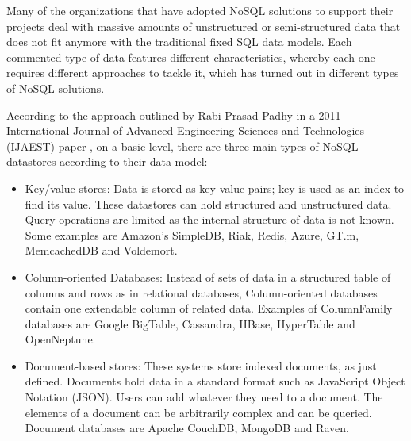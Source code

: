 Many of the organizations that have adopted NoSQL solutions to support their projects deal with massive amounts of unstructured or semi-structured data that does not fit anymore with the traditional fixed SQL data models. Each commented type of data features different characteristics, whereby each one requires different approaches to tackle it, which has turned out in different types of NoSQL solutions.
\par
According to the approach outlined by Rabi Prasad Padhy in a 2011 International Journal of Advanced Engineering Sciences and Technologies (IJAEST) paper \cite{padhy2011rdbms}, on a basic level, there are three main types of NoSQL datastores according to their data model:
\begin{itemize}
\item Key/value stores: Data is stored as key-value pairs; key is used as an index to find its value. These datastores can hold structured and unstructured data. Query operations are limited as the internal structure of data is not known. Some examples are Amazon's SimpleDB, Riak, Redis, Azure, GT.m, MemcachedDB and Voldemort.
\item Column-oriented Databases: Instead of sets of data in a structured table of columns and rows as in relational databases, Column-oriented databases contain one extendable column of related data. Examples of ColumnFamily databases are Google BigTable, Cassandra, HBase, HyperTable and OpenNeptune.
\item Document-based stores: These systems store indexed documents, as just defined. Documents hold data in a standard format such as JavaScript Object Notation (JSON). Users can add whatever they need to a document. The elements of a document can be arbitrarily complex and can be queried. Document databases are Apache CouchDB, MongoDB and Raven.
\end{itemize}



